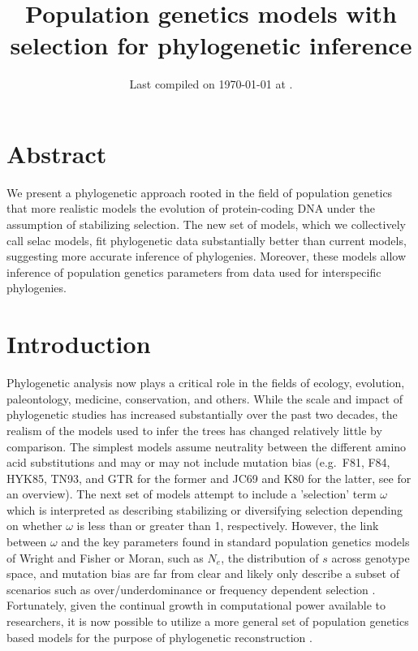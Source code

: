 \documentclass{article}
\title{Population genetics models with selection for phylogenetic
inference} \date{Last compiled on \today\xspace at \currenttime.}
\newcommand{\Ne}{\ensuremath{{N_e}}\xspace} %
\begin{document}
\maketitle


\section*{Abstract}
We present a phylogenetic approach rooted in the field of population genetics that more realistic models the evolution of protein-coding DNA under the assumption of stabilizing selection.
The new set of models, which we collectively call selac models, fit phylogenetic data substantially better than current models, suggesting more accurate inference of phylogenies.
Moreover, these models allow inference of population genetics parameters from data used for interspecific phylogenies.

\section*{Introduction}
Phylogenetic analysis now plays a critical role in the fields of ecology, evolution, paleontology, medicine, conservation, and others.
While the scale and impact of phylogenetic studies has increased substantially over the past two decades, the realism of the models used to infer the trees has changed relatively little by comparison.
The simplest models assume neutrality between the different amino acid substitutions and may or may not include mutation bias (e.g.~F81, F84, HYK85, TN93, and GTR for the former and JC69 and K80 for the latter, see \citet{Yang2014} for an overview).
The next set of models attempt to include a 'selection' term $\omega$ which is interpreted as describing stabilizing or diversifying selection depending on whether $\omega$ is less than or greater than 1, respectively. 
However, the link between $\omega$ and the key parameters found in standard population genetics models of Wright and Fisher or Moran, such as \Ne, the distribution of $s$ across genotype space, and mutation bias are far from clear and likely only describe a subset of scenarios such as over/underdominance or frequency dependent selection  \citep{HughesAndNei1988}.
Fortunately, given the continual growth in computational power available to researchers, it is now possible to utilize a more general set of population genetics based models for the purpose of phylogenetic reconstruction \citep[e.g.][]{HalpernAndBruno1998,RobinsonEtAl2003,LartillotAndPhilippe2004,RodrigueAndLartillot2014}.
\end{document}

